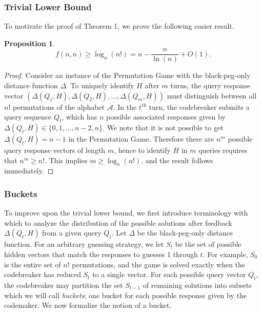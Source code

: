 \documentclass[12pt, a4paper]{article}
\newcommand{\nth}{^{\text{th}}}       %
\newtheorem{proposition}{Proposition}
\begin{document}
	\subsubsection{Trivial Lower Bound}
	To motivate the proof of Theorem 1, we prove the following easier result.
	\begin{proposition}
		\begin{equation*}
			f(n, n)\ge \log_{n}(n!) = n-\frac{n}{\ln(n)}+O(1).		
		\end{equation*}
	\end{proposition}
	\begin{proof}
		Consider an instance of the Permutation Game with the black-peg-only distance function $\Delta$. To uniquely identify $H$ after $m$ turns, the query response vector $(\Delta(Q_1, H), \Delta(Q_2, H), \ldots, \Delta(Q_m, H))$ must distinguish between all $n!$ permutations of the alphabet $\mathcal{A}$. In the $t\nth$ turn, the codebreaker submits a query sequence $Q_t$, which has $n$ possible associated responses given by $\Delta(Q_t, H)\in\{0, 1, \ldots, n-2, n\}$. We note that it is not possible to get $\Delta(Q_t, H)=n-1$ in the Permutation Game. Therefore there are $n^m$ possible query response vectors of length $m$, hence to identify $H$ in $m$ queries requires that $n^m\ge n!$. This implies $m\ge\log_n(n!)$, and the result follows immediately.
	\end{proof}

	\subsubsection{Buckets}
	To improve upon the trivial lower bound, we first introduce terminology with which to analyze the distribution of the possible solutions after feedback $\Delta(Q_t, H)$ from a given query $Q_t$. Let $\Delta$ be the black-peg-only distance function. For an arbitrary guessing strategy, we let $S_t$ be the set of possible hidden vectors that match the responses to guesses 1 through $t$. For example, $S_0$ is the entire set of $n!$ permutations, and the game is solved exactly when the codebreaker has reduced $S_t$ to a single vector. For each possible query vector $Q_t$, the codebreaker may partition the set $S_{t-1}$ of remaining solutions into subsets which we will call \textit{buckets}; one bucket for each possible response given by the codemaker. We now formalize the notion of a bucket.
	
\end{document}
